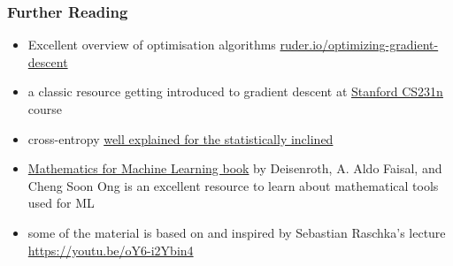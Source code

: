 \documentclass[
  aspectratio=1610, %
  intlimits %
]{beamer}
\begin{document}
   \begin{frame}
     \frametitle{Further Reading}

     \vfill
     \begin{itemize}
     \item Excellent overview of optimisation algorithms \href{https://ruder.io/optimizing-gradient-descent/}{ruder.io/optimizing-gradient-descent}
     \item a classic resource getting introduced to gradient descent at \href{https://cs231n.github.io/optimization-1/}{Stanford CS231n} course
       
     \item cross-entropy \href{https://towardsdatascience.com/data-science-interview-deep-dive-cross-entropy-loss-b10355eb4ace}{well explained for the statistically inclined}
     \item \href{https://mml-book.github.io/}{Mathematics for Machine Learning book} by Deisenroth, A. Aldo Faisal, and Cheng Soon Ong is an excellent resource to learn about mathematical tools used for ML
       
     \item some of the material is based on and inspired by Sebastian Raschka's lecture \href{L6.2 Understanding Automatic Differentiation via Computation Graphs}{https://youtu.be/oY6-i2Ybin4}
       
     \end{itemize}
     \vfill
   \end{frame}

    

   
\end{document}
